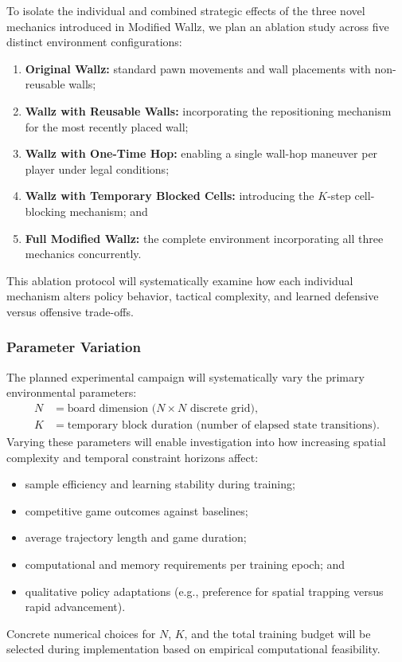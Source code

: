 \documentclass{article}
\begin{document}
To isolate the individual and combined strategic effects of the three novel mechanics introduced in Modified Wallz, we plan an ablation study across five distinct environment configurations:
\begin{enumerate}
    \item \textbf{Original Wallz:} standard pawn movements and wall placements with non-reusable walls;
    \item \textbf{Wallz with Reusable Walls:} incorporating the repositioning mechanism for the most recently placed wall;
    \item \textbf{Wallz with One-Time Hop:} enabling a single wall-hop maneuver per player under legal conditions;
    \item \textbf{Wallz with Temporary Blocked Cells:} introducing the $K$-step cell-blocking mechanism; and
    \item \textbf{Full Modified Wallz:} the complete environment incorporating all three mechanics concurrently.
\end{enumerate}
This ablation protocol will systematically examine how each individual mechanism alters policy behavior, tactical complexity, and learned defensive versus offensive trade-offs.

\subsubsection{Parameter Variation}
\label{subsubsec:parameter_variation}

The planned experimental campaign will systematically vary the primary environmental parameters:
\begin{align*}
N &= \text{board dimension ($N \times N$ discrete grid)}, \\
K &= \text{temporary block duration (number of elapsed state transitions)}.
\end{align*}
Varying these parameters will enable investigation into how increasing spatial complexity and temporal constraint horizons affect:
\begin{itemize}
    \item sample efficiency and learning stability during training;
    \item competitive game outcomes against baselines;
    \item average trajectory length and game duration;
    \item computational and memory requirements per training epoch; and
    \item qualitative policy adaptations (e.g., preference for spatial trapping versus rapid advancement).
\end{itemize}
Concrete numerical choices for $N$, $K$, and the total training budget will be selected during implementation based on empirical computational feasibility.
\end{document}
